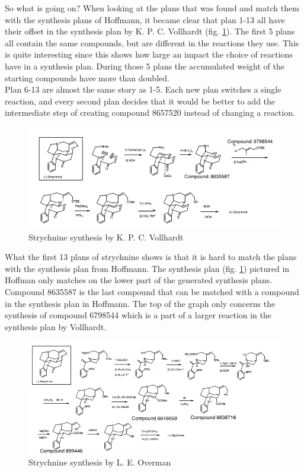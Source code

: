 \documentclass[a4paper,10pt,titlepage]{paper}
\begin{document}
So what is going on? When looking at the plans that was found and match them with the synthesis plans of Hoffmann, it became clear that plan 1-13 all have their offset in the synthesis plan by K. P. C. Vollhardt (fig. \ref{fig::Vollhardt}). The first 5 plans all contain the same compounds, but are different in the reactions they use. This is quite interesting since this shows how large an impact the choice of reactions have in a synthesis plan. During those 5 plans the accumulated weight of the starting compounds have more than doubled.\\
Plan 6-13 are almost the same story as 1-5. Each new plan switches a single reaction, and every second plan decides that it would be better to add the intermediate step of creating compound 8657520 instead of changing a reaction.
\begin{figure}
\centering
\includegraphics[scale=0.5, angle=90]{Synteseplaner/Strychnine/Vollhardt.png}
\caption{Strychnine synthesis by K. P. C. Vollhardt \cite{SynthesisPlans}}
\label{fig::Vollhardt}
\end{figure}
What the first 13 plans of strychnine shows is that it is hard to match the plans with the synthesis plan from Hoffmann. The synthesis plan (fig. \ref{fig::Vollhardt}) pictured in Hoffman only matches on the lower part of the generated synthesis plans. Compound 8635587 is the last compound that can be matched with a compound in the synthesis plan in Hoffmann. The top of the graph only concerns the synthesis of compound 6798544 which is a part of a larger reaction in the synthesis plan by Vollhardt.\\
\begin{figure}
\centering
\includegraphics[scale=0.5, angle=90]{Synteseplaner/Strychnine/Overman.png}
\caption{Strychnine synthesis by L. E. Overman \cite{SynthesisPlans}}
\label{fig::Overman}
\end{figure}
\end{document}
